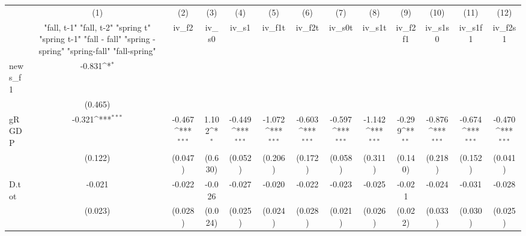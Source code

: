 {
\def\sym#1{\ifmmode^{#1}\else\(^{#1}\)\fi}
\begin{tabular}{l*{12}{c}}
\toprule
            &\multicolumn{1}{c}{(1)}&\multicolumn{1}{c}{(2)}&\multicolumn{1}{c}{(3)}&\multicolumn{1}{c}{(4)}&\multicolumn{1}{c}{(5)}&\multicolumn{1}{c}{(6)}&\multicolumn{1}{c}{(7)}&\multicolumn{1}{c}{(8)}&\multicolumn{1}{c}{(9)}&\multicolumn{1}{c}{(10)}&\multicolumn{1}{c}{(11)}&\multicolumn{1}{c}{(12)}\\
            &\multicolumn{1}{c}{  "fall, t-1" "fall, t-2" "spring t" "spring t-1"  "fall - fall" "spring - spring" "spring-fall" "fall-spring" }&\multicolumn{1}{c}{iv\_f2}&\multicolumn{1}{c}{iv\_s0}&\multicolumn{1}{c}{iv\_s1}&\multicolumn{1}{c}{iv\_f1t}&\multicolumn{1}{c}{iv\_f2t}&\multicolumn{1}{c}{iv\_s0t}&\multicolumn{1}{c}{iv\_s1t}&\multicolumn{1}{c}{iv\_f2f1}&\multicolumn{1}{c}{iv\_s1s0}&\multicolumn{1}{c}{iv\_s1f1}&\multicolumn{1}{c}{iv\_f2s1}\\
\midrule
news\_f1     &      -0.831\sym{*}  &                     &                     &                     &                     &                     &                     &                     &                     &                     &                     &                     \\
            &     (0.465)         &                     &                     &                     &                     &                     &                     &                     &                     &                     &                     &                     \\
\addlinespace
gRGDP       &      -0.321\sym{***}&      -0.467\sym{***}&       1.102\sym{*}  &      -0.449\sym{***}&      -1.072\sym{***}&      -0.603\sym{***}&      -0.597\sym{***}&      -1.142\sym{***}&      -0.299\sym{**} &      -0.876\sym{***}&      -0.674\sym{***}&      -0.470\sym{***}\\
            &     (0.122)         &     (0.047)         &     (0.630)         &     (0.052)         &     (0.206)         &     (0.172)         &     (0.058)         &     (0.311)         &     (0.140)         &     (0.218)         &     (0.152)         &     (0.041)         \\
\addlinespace
D.tot       &      -0.021         &      -0.022         &      -0.026         &      -0.027         &      -0.020         &      -0.022         &      -0.023         &      -0.025         &      -0.021         &      -0.024         &      -0.031         &      -0.028         \\
            &     (0.023)         &     (0.028)         &     (0.024)         &     (0.025)         &     (0.024)         &     (0.028)         &     (0.021)         &     (0.026)         &     (0.022)         &     (0.033)         &     (0.030)         &     (0.025)         \\

\end{tabular}}
